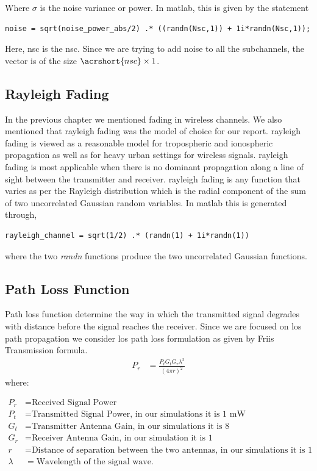 Where $\sigma$ is the noise variance or power. In \gls{matlab}, this is given by the statement
\begin{verbatim}
noise = sqrt(noise_power_abs/2) .* ((randn(Nsc,1)) + 1i*randn(Nsc,1));
\end{verbatim}
Here, \acrshort{nsc} is the \acrlong{nsc}. Since we are trying to add noise to all the subchannels, the vector is of the size $\acrshort{nsc} \times 1$.

\subsection{Rayleigh Fading}
In the previous chapter we mentioned fading in wireless channels. We also mentioned that \gls{rayleigh fading} was the model of choice for our report. \gls{rayleigh fading} is viewed as a reasonable model for tropospheric and ionospheric propagation as well as for heavy urban settings for wireless signals. \gls{rayleigh fading} is most applicable when there is no dominant propagation along a line of sight between the transmitter and receiver. \gls{rayleigh fading} is any function that varies as per the Rayleigh distribution which is the radial component of the sum of two uncorrelated Gaussian random variables. In \gls{matlab} this is generated through,
\begin{verbatim}
rayleigh_channel = sqrt(1/2) .* (randn(1) + 1i*randn(1))
\end{verbatim}
where the two \emph{randn} functions produce the two uncorrelated Gaussian functions.

\subsection{Path Loss Function}
Path loss function determine the way in which the transmitted signal degrades with distance before the signal reaches the receiver. Since we are focused on \acrlong{los} path propagation we consider \acrshort{los} path loss formulation as given by Friis Transmission formula.
\begin{align*}
P_r &= \frac{P_t G_t G_r \lambda^2}{(4 \pi r)^2} 
\end{align*}
where:

\begin{align*}
P_r &= \text{Received Signal Power}\\
P_t &= \text{Transmitted Signal Power, in our simulations it is 1 mW}\\
G_t &= \text{Transmitter Antenna Gain, in our simulations it is 8}\\
G_r &= \text{Receiver Antenna Gain, in our simulation it is 1}\\
r &= \text{Distance of separation between the two antennas, in our simulations it is 1 Km}\\
\lambda &= \text{Wavelength of the signal wave}.\\
\end{align*}



